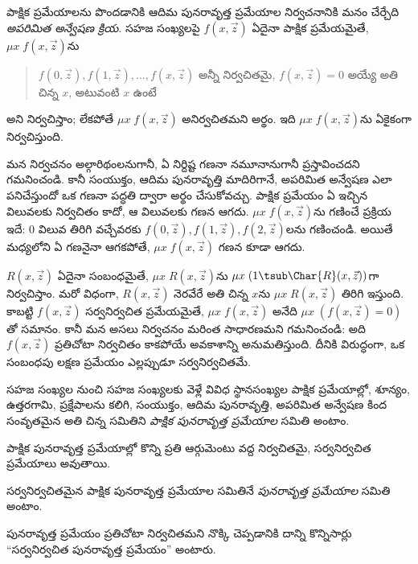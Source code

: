 \documentclass[../../../include/open-logic-section]{subfiles}
\begin{document}
పాక్షిక ప్రమేయాలను పొందడానికి ఆదిమ పునరావృత్త ప్రమేయాల నిర్వచనానికి
మనం చేర్చేది \emph{అపరిమిత అన్వేషణ క్రియ}. సహజ సంఖ్యలపై
$f(x,\vec z)$ ఏదైనా పాక్షిక ప్రమేయమైతే, $\mu x\;f(x,\vec z)$ను
\begin{quote}
  $f(0,\vec z), f(1,\vec z), \dots, f(x,\vec z)$ అన్నీ
  నిర్వచితమై, $f(x,\vec z)=0$ అయ్యే అతి చిన్న $x$, అటువంటి $x$
  ఉంటే
\end{quote}
అని నిర్వచిస్తాం; లేకపోతే $\mu x\;f(x,\vec z)$ అనిర్వచితమని అర్థం.
ఇది $\mu x\;f(x,\vec z)$ను ఏకైకంగా నిర్వచిస్తుంది.

\begin{explain}
మన నిర్వచనం అల్గారిథంలనుగానీ,
ఏ నిర్దిష్ట గణనా నమూనానుగానీ ప్రస్తావించదని గమనించండి. కానీ సంయుక్తం,
ఆదిమ పునరావృత్తి మాదిరిగానే, అపరిమిత అన్వేషణ ఎలా పనిచేస్తుందో ఒక
గణనా పద్ధతి ద్వారా అర్థం చేసుకోవచ్చు. పాక్షిక ప్రమేయం ఏ ఇచ్చిన విలువలకు
నిర్వచితం కాదో, ఆ విలువలకు గణన ఆగదు. $\mu x\;
f(x,\vec z)$ను గణించే ప్రక్రియ ఇదే: 0 విలువ తిరిగి వచ్చేవరకు
$f(0,\vec z), f(1,\vec z), f(2,\vec z)$లను గణించండి. అయితే
మధ్యలోని ఏ గణనైనా ఆగకపోతే, $\mu x\;f(x,\vec z)$ గణన కూడా ఆగదు.
\end{explain}

$R(x,\vec z)$ ఏదైనా సంబంధమైతే, $\mu x\;R(x,\vec z)$ను
$\mu x\;(1\tsub\Char{R}(x,\vec z))$గా నిర్వచిస్తాం. మరో విధంగా,
$R(x,\vec z)$ నెరవేరే అతి చిన్న $x$ను $\mu x\;R(x,\vec z)$ తిరిగి
ఇస్తుంది. కాబట్టి $f(x,\vec z)$ సర్వనిర్వచిత ప్రమేయమైతే,
$\mu x\;f(x,\vec z)$ అనేది $\mu x\;(f(x,\vec z)=0)$తో సమానం.
కానీ మన అసలు నిర్వచనం మరింత సాధారణమని గమనించండి: అది $f(x,\vec z)$
ప్రతిచోటా నిర్వచితం కాకపోయే అవకాశాన్ని అనుమతిస్తుంది. దీనికి విరుద్ధంగా,
ఒక సంబంధపు లక్షణ ప్రమేయం ఎల్లప్పుడూ సర్వనిర్వచితమే.

\begin{defn}
సహజ సంఖ్యల నుంచి సహజ సంఖ్యలకు వెళ్లే వివిధ స్థానసంఖ్యల పాక్షిక
ప్రమేయాల్లో, శూన్యం, ఉత్తరగామి, ప్రక్షేపాలను కలిగి, సంయుక్తం, ఆదిమ
పునరావృత్తి, అపరిమిత అన్వేషణ కింద సంవృతమైన అతి చిన్న సమితిని
\emph{పాక్షిక పునరావృత్త ప్రమేయాల} సమితి అంటాం.
\end{defn}

పాక్షిక పునరావృత్త ప్రమేయాల్లో కొన్ని ప్రతి ఆర్గుమెంటు వద్ద
నిర్వచితమై, సర్వనిర్వచిత ప్రమేయాలు అవుతాయి.

\begin{defn}
సర్వనిర్వచితమైన పాక్షిక పునరావృత్త ప్రమేయాల సమితినే
\emph{పునరావృత్త ప్రమేయాల} సమితి అంటాం.
\end{defn}

పునరావృత్త ప్రమేయం ప్రతిచోటా నిర్వచితమని నొక్కి చెప్పడానికి దాన్ని
కొన్నిసార్లు ``సర్వనిర్వచిత పునరావృత్త ప్రమేయం'' అంటారు.
\end{document}
